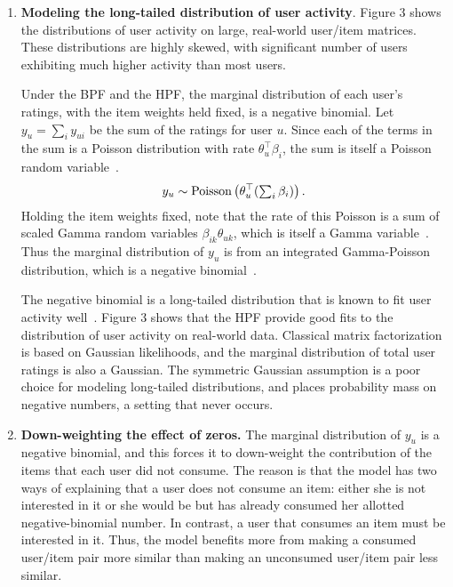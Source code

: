 \begin{enumerate}
\item {\bf Modeling the long-tailed distribution of user activity}.
  Figure 3 shows the distributions of user activity on large,
  real-world user/item matrices. These distributions are highly
  skewed, with significant number of users exhibiting much higher
  activity than most users.

Under the BPF and the HPF, the marginal distribution of each user's
ratings, with the item weights held fixed, is a negative binomial.
Let $y_{u} = \sum_{i} y_{ui}$ be the sum of the ratings for user $u$.
Since each of the terms in the sum is a Poisson distribution with rate
$\theta_u^\top \beta_i$, the sum is itself a Poisson random
variable~\cite{Johnson:2005}.
\begin{equation}
  y_u \sim \textrm{Poisson}\left(\theta_u^\top (\textstyle \sum_{i} \beta_{i})\right).
\end{equation}
Holding the item weights fixed, note that the rate of this Poisson is
a sum of scaled Gamma random variables $\beta_{ik} \theta_{uk}$, which
is itself a Gamma variable~\cite{Norman:1994}.  Thus the marginal
distribution of $y_u$ is from an integrated Gamma-Poisson
distribution, which is a negative binomial~\cite{Gelman:1995}.

The negative binomial is a long-tailed distribution that is known to
fit user activity well~\cite{Goodhardt:1984,Dunn1983}.  Figure 3 shows
that the HPF provide good fits to the distribution of user activity on
real-world data.  Classical matrix factorization is based on Gaussian
likelihoods, and the marginal distribution of total user ratings is
also a Gaussian.  The symmetric Gaussian assumption is a poor choice
for modeling long-tailed distributions, and places probability mass on
negative numbers, a setting that never occurs.


\item {\bf Down-weighting the effect of zeros.}
The marginal distribution of $y_u$ is a negative binomial, and this
forces it to down-weight the contribution of the items that each user
did not consume. The reason is that the model has two ways of
explaining that a user does not consume an item: either she is not
interested in it or she would be but has already consumed her allotted
negative-binomial number.  In contrast, a user that consumes an item
must be interested in it.  Thus, the model benefits more from making a
consumed user/item pair more similar than making an unconsumed
user/item pair less similar.


\end{enumerate}
